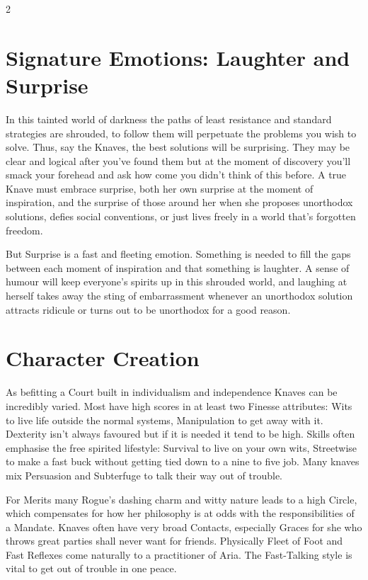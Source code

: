 \begin{multicols}{2}
\section*{Signature Emotions: Laughter and Surprise}

In this tainted world of darkness the paths of least resistance and standard strategies are shrouded, to follow them will perpetuate the problems you wish to solve. Thus, say the Knaves, the best solutions will be surprising. They may be clear and logical after you've found them but at the moment of discovery you'll smack your forehead and ask how come you didn't think of this before. A true Knave must embrace surprise, both her own surprise at the moment of inspiration, and the surprise of those around her when she proposes unorthodox solutions, defies social conventions, or just lives freely in a world that's forgotten freedom. 

But Surprise is a fast and fleeting emotion. Something is needed to fill the gaps between each moment of inspiration and that something is laughter. A sense of humour will keep everyone's spirits up in this shrouded world, and laughing at herself takes away the sting of embarrassment whenever an unorthodox solution attracts ridicule or turns out to be unorthodox for a good reason. 

\section*{Character Creation}

As befitting a Court built in individualism and independence Knaves can be incredibly varied. Most have high scores in at least two Finesse attributes: Wits to live life outside the normal systems, Manipulation to get away with it. Dexterity isn't always favoured but if it is needed it tend to be high. Skills often emphasise the free spirited lifestyle: Survival to live on your own wits, Streetwise to make a fast buck without getting tied down to a nine to five job. Many knaves mix Persuasion and Subterfuge to talk their way out of trouble.

For Merits many Rogue's dashing charm and witty nature leads to a high Circle, which compensates for how her philosophy is at odds with the responsibilities of a Mandate. Knaves often have very broad Contacts, especially Graces for she who throws great parties shall never want for friends. Physically Fleet of Foot and Fast Reflexes come naturally to a practitioner of Aria. The Fast-Talking style is vital to get out of trouble in one peace.


\end{multicols}
